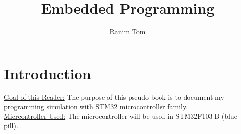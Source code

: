 \documentclass[12pt,a4paper]{book}
\title{Embedded Programming}
\author{Ranim Tom}
\begin{document}
% 



\maketitle

\tableofcontents



\printnomenclature




\listoftodos


\pagestyle{fancy}
\fancyhf{} %
\rhead{\rightmark}



\chapter{Introduction}

\underline{Goal of this Reader:} The purpose of this pseudo book is to document my programming simulation with STM32 microcontroller family.\\

\underline{Micrcontroller Used:} 
The microcontroller will be used in STM32F103 B (blue pill).














\end{document}
